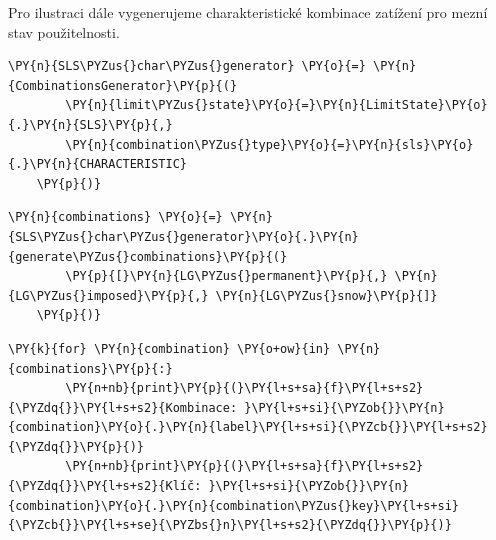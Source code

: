     Pro ilustraci dále vygenerujeme charakteristické kombinace zatížení pro mezní stav použitelnosti.
        \begin{tcolorbox}[breakable, size=fbox, boxrule=1pt, pad at break*=1mm,colback=cellbackground, colframe=cellborder]
    \begin{Verbatim}[commandchars=\\\{\}]
    \PY{n}{SLS\PYZus{}char\PYZus{}generator} \PY{o}{=} \PY{n}{CombinationsGenerator}\PY{p}{(}
        \PY{n}{limit\PYZus{}state}\PY{o}{=}\PY{n}{LimitState}\PY{o}{.}\PY{n}{SLS}\PY{p}{,}
        \PY{n}{combination\PYZus{}type}\PY{o}{=}\PY{n}{sls}\PY{o}{.}\PY{n}{CHARACTERISTIC}
    \PY{p}{)}
    \end{Verbatim}
    \end{tcolorbox}
    
        \begin{tcolorbox}[breakable, size=fbox, boxrule=1pt, pad at break*=1mm,colback=cellbackground, colframe=cellborder]
    \begin{Verbatim}[commandchars=\\\{\}]
    \PY{n}{combinations} \PY{o}{=} \PY{n}{SLS\PYZus{}char\PYZus{}generator}\PY{o}{.}\PY{n}{generate\PYZus{}combinations}\PY{p}{(}
        \PY{p}{[}\PY{n}{LG\PYZus{}permanent}\PY{p}{,} \PY{n}{LG\PYZus{}imposed}\PY{p}{,} \PY{n}{LG\PYZus{}snow}\PY{p}{]}
    \PY{p}{)}
    \end{Verbatim}
    \end{tcolorbox}
    
        \begin{tcolorbox}[breakable, size=fbox, boxrule=1pt, pad at break*=1mm,colback=cellbackground, colframe=cellborder]
    \begin{Verbatim}[commandchars=\\\{\}]
    \PY{k}{for} \PY{n}{combination} \PY{o+ow}{in} \PY{n}{combinations}\PY{p}{:}
        \PY{n+nb}{print}\PY{p}{(}\PY{l+s+sa}{f}\PY{l+s+s2}{\PYZdq{}}\PY{l+s+s2}{Kombinace: }\PY{l+s+si}{\PYZob{}}\PY{n}{combination}\PY{o}{.}\PY{n}{label}\PY{l+s+si}{\PYZcb{}}\PY{l+s+s2}{\PYZdq{}}\PY{p}{)}
        \PY{n+nb}{print}\PY{p}{(}\PY{l+s+sa}{f}\PY{l+s+s2}{\PYZdq{}}\PY{l+s+s2}{Klíč: }\PY{l+s+si}{\PYZob{}}\PY{n}{combination}\PY{o}{.}\PY{n}{combination\PYZus{}key}\PY{l+s+si}{\PYZcb{}}\PY{l+s+se}{\PYZbs{}n}\PY{l+s+s2}{\PYZdq{}}\PY{p}{)}
    \end{Verbatim}
    \end{tcolorbox}
    
